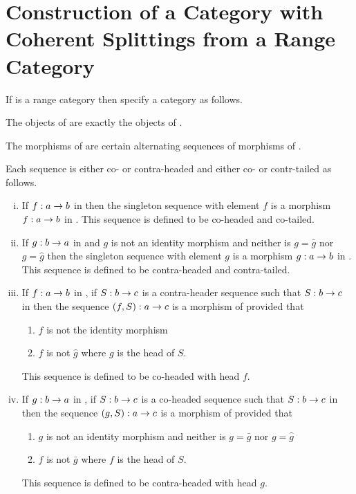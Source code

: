 \documentclass[10pt,a4paper]{article}
\theoremstyle{remark}
\begin{document}
\newpage
\section{Construction of a Category with Coherent Splittings from a Range Category}
\begin{definition}
If \catcw is a range category then specify a category \catcaltw as follows.

The objects of \catcaltw are exactly the objects of \catc.

The morphisms of \catcaltw are certain alternating sequences of morphisms of \catcw.

Each sequence is either co- or contra-headed and either co- or contr-tailed as follows.
\begin{enumerate}[(i)]
\item If $f: a \rightarrow b$ in \catcw then the singleton sequence with element $f$ is a morphism $f: a \rightarrow b$ in \catc. This sequence is defined to be co-headed and co-tailed.
\item If $g: b \rightarrow a$ in \catcw and $g$ is not an identity morphism and neither is 
$g=\bar{g}$ nor $g=\hat{g}$ 
 then the singleton sequence with element $g$ is a morphism $g: a \rightarrow b$ in \catc. This sequence is defined to be contra-headed and contra-tailed.
\item If $f: a \rightarrow b$ in \catc, if  $S:b \rightarrow c$ is a contra-header sequence such that $S:b \rightarrow c$ in \catcaltw then the sequence $(f,S): a \rightarrow c$ is a morphism 
of \catcaltw  provided that
       \begin{enumerate}
       \item $f$ is not the identity morphism 
       \item $f$ is not $\hat{g}$ where $g$ is the head of $S$.
       \end{enumerate}
This sequence is defined to be co-headed with head $f$.
\item If $g: b \rightarrow a$ in \catc, if  $S:b \rightarrow c$ is a co-headed sequence such that $S:b \rightarrow c$ in \catcaltw then the sequence $(g,S): a \rightarrow c$ is a morphism 
of \catcaltw provided that
       \begin{enumerate}
       \item $g$ is not an identity morphism and neither is $g=\bar{g}$ nor $g=\hat{g}$
       \item $f$ is not $\bar{g}$ where $f$ is the head of $S$.
       \end{enumerate} 
This sequence is defined to be contra-headed with head $g$.
\end{enumerate}


\end{definition}
\end{document}
